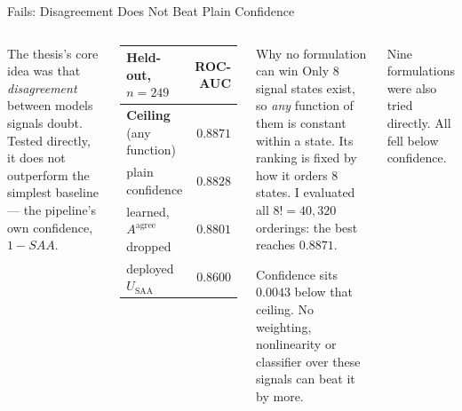 \documentclass[aspectratio=169,11pt]{beamer}
\begin{document}
\begin{frame}{Fails: Disagreement Does Not Beat Plain Confidence}
\begin{columns}[T]
\small
The thesis's core idea was that \emph{disagreement} between models signals doubt. Tested directly, it does not outperform the simplest baseline --- the pipeline's own confidence, $1 - SAA$.
\vspace{1mm}
\begin{center}
\footnotesize
\begin{tabular}{@{}l r@{}}
\toprule
\textbf{Held-out, $n=249$} & \textbf{ROC-AUC} \\
\midrule
\textbf{Ceiling} (any function) & $\mathbf{0.8871}$ \\
plain confidence & $0.8828$ \\
learned, $A^{\text{agree}}$ dropped & $0.8801$ \\
deployed $U_{\text{SAA}}$ & $0.8600$ \\
\bottomrule
\end{tabular}
\end{center}

\begin{alertblock}{\small Why no formulation can win}
\footnotesize Only 8 signal states exist, so \emph{any} function of them is constant within a state. Its ranking is fixed by how it orders 8 states. I evaluated all $8! = 40{,}320$ orderings: the best reaches $0.8871$.
\vspace{1mm}

Confidence sits \textbf{$0.0043$} below that ceiling. No weighting, nonlinearity or classifier over these signals can beat it by more.
\end{alertblock}
\vspace{1mm}
\footnotesize Nine formulations were also tried directly. All fell below confidence.
\end{columns}
\end{frame}
\end{document}
